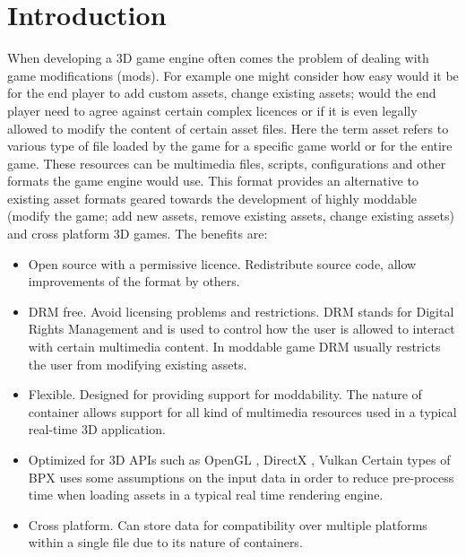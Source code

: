\section{Introduction}
When developing a 3D game engine often comes the problem of dealing with game modifications (mods). For example one might consider how easy would it be for the end player to add custom assets, change existing assets; would the end player need to agree against certain complex licences or if it is even legally allowed to modify the content of certain asset files.\newline
Here the term asset refers to various type of file loaded by the game for a specific game world or for the entire game. These resources can be multimedia files, scripts, configurations and other formats the game engine would use.\newline
This format provides an alternative to existing asset formats geared towards the development of highly moddable (modify the game; add new assets, remove existing assets, change existing assets) and cross platform 3D games.\newline
The benefits are:
\begin{itemize}
    \item Open source with a permissive licence.\newline
    Redistribute source code, allow improvements of the format by others.
    \item DRM \cite{DRM} free.\newline
    Avoid licensing problems and restrictions. DRM stands for Digital Rights Management and is used to control how the user is allowed to interact with certain multimedia content. In moddable game DRM usually restricts the user from modifying existing assets.
    \item Flexible.\newline
    Designed for providing support for moddability. The nature of container allows support for all kind of multimedia resources used in a typical real-time 3D application.
    \item Optimized for 3D APIs such as OpenGL \cite{OpenGL}, DirectX \cite{DirectX}, Vulkan \cite{Vulkan}\newline
    Certain types of BPX uses some assumptions on the input data in order to reduce pre-process time when loading assets in a typical real time rendering engine.
    \item Cross platform.\newline
    Can store data for compatibility over multiple platforms within a single file due to its nature of containers.
\end{itemize}
